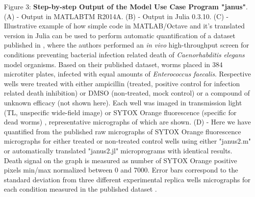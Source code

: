 Figure 3: \textbf{Step-by-step Output of the Model Use Case Program "janus"}. (A) - Output in MATLABTM R2014A. (B) - Output in Julia 0.3.10. (C) - Illustrative example of how simple code in MATLAB/Octave and it's translated version in Julia can be used to perform automatic quantification of a dataset published in \cite{Moy_2009}, where the authors performed an \textit{in vivo} high-throughput screen for conditions preventing bacterial infection related death of \textit{Caenorhabditis elegans} model organisms. Based on their published dataset, worms placed in 384 microtiter plates, infected with equal amounts of \textit{Enterococcus faecalis}. Respective wells were treated with either ampicillin (treated, positive control for infection related death inhibition) or DMSO (non-treated, mock control) or a compound of unknown efficacy (not shown here). Each well was imaged in transmission light (TL, unspecific wide-field image) or SYTOX Orange fluorescence (specific for dead worms) \cite{Moy_2009}, representative micrographs of which are shown. (D) - Here we have quantified from the published raw micrographs of SYTOX Orange fluorescence micrographs for either treated or non-treated control wells using either "janus2.m" or automatically translated "janus2.jl" microprograms with identical results. Death signal on the graph is measured as number of SYTOX Orange positive pixels min/max normalized between 0 and 7000. Error bars correspond to the standard deviation from three different experimental replica wells micrographs for each condition measured in the published dataset \cite{Moy_2009}.